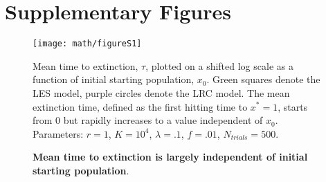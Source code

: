 %	
%	
%	
%	
%	
%	
%	
%	
%	
%	

%

\newpage
\section{Supplementary Figures}
\renewcommand\thefigure{S\arabic{figure}}  
\setcounter{figure}{0}    
\begin{figure}[h]
\centerline{
	\texttt{[image: math/figureS1]}}
	\caption{\textbf{Mean time to extinction is largely independent of initial starting population}.}  {Mean time to extinction, $\tau$, plotted on a shifted log scale as a function of initial starting population, $x_0$.  Green squares denote the LES model, purple circles denote the LRC model.  The mean extinction time, defined as the first hitting time to $x^* = 1$, starts from 0 but rapidly increases to a value independent of $x_0$.  Parameters:  $r = 1$, $K = 10^4$, $\lambda = .1$, $f = .01$, $N_{trials} = 500$.}
\end{figure}


